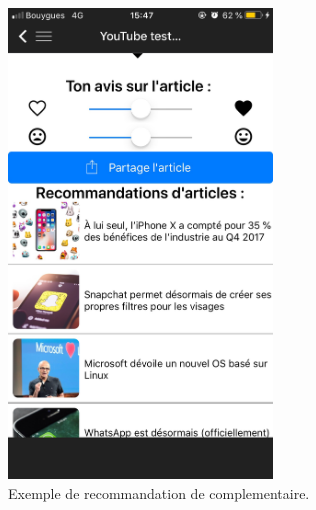 \begin{figure}[htp]
  \centering
  \includegraphics[width=7cm]{images/comp}
  \caption{Exemple de  recommandation de complementaire.}
  \label{fig:screen-comple}
\end{figure}

